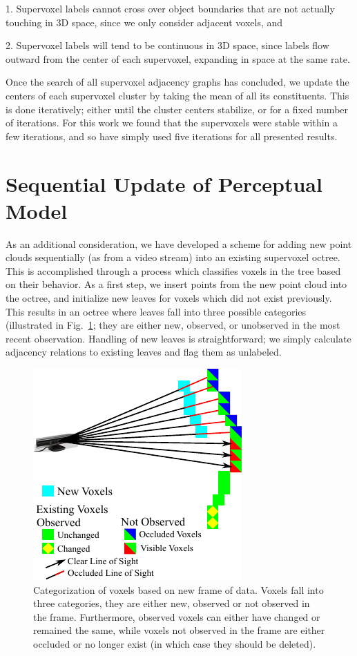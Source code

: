 1. Supervoxel labels cannot cross over object boundaries that are not actually touching in 3D space, since we only consider adjacent voxels, and 

2. Supervoxel labels will tend to be continuous in 3D space, since labels flow outward from the center of each supervoxel, expanding in space at the same rate.

Once the search of all supervoxel adjacency graphs has concluded, we update the centers of each supervoxel cluster by taking the mean of all its constituents. This is done iteratively; either until the cluster centers stabilize, or for a fixed number of iterations. For this work we found that the supervoxels were stable within a few iterations, and so have simply used five iterations for all presented results. 

\section{Sequential Update of Perceptual Model}
As an additional consideration, we have developed a scheme for adding new point clouds sequentially (as from a video stream) into an existing supervoxel octree. This is accomplished through a process which classifies voxels in the tree based on their behavior. As a first step, we insert points from the new point cloud into the octree, and initialize new leaves for voxels which did not exist previously. This results in an octree where leaves fall into three possible categories (illustrated in Fig.~\ref{fig:VoxelVisibility}; they are either new, observed, or unobserved in the most recent observation. Handling of new leaves is straightforward; we simply calculate adjacency relations to existing leaves and flag them as unlabeled. 
\begin{figure}
  \centering
  \includegraphics[scale=1.5]{figures/IROS2013/VoxelVisibility.pdf}
  \caption[Voxel Visibility]{Categorization of voxels based on new frame of data. Voxels fall into three categories, they are either new, observed or not observed in the frame. Furthermore, observed voxels can either have changed or remained the same, while voxels not observed in the frame are either occluded or no longer exist (in which case they should be deleted).}
  \label{fig:VoxelVisibility}
\end{figure}

